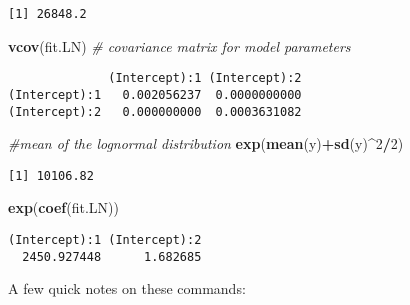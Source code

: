 \documentclass[]{book}
\newenvironment{Shaded}{\begin{snugshade}}{\end{snugshade}}
\newcommand{\KeywordTok}[1]{\textcolor[rgb]{0.13,0.29,0.53}{\textbf{#1}}}
\newcommand{\DecValTok}[1]{\textcolor[rgb]{0.00,0.00,0.81}{#1}}
\newcommand{\CommentTok}[1]{\textcolor[rgb]{0.56,0.35,0.01}{\textit{#1}}}
\newcommand{\OperatorTok}[1]{\textcolor[rgb]{0.81,0.36,0.00}{\textbf{#1}}}
\newcommand{\NormalTok}[1]{#1}
\theoremstyle{definition}
\theoremstyle{definition}
\theoremstyle{definition}
\theoremstyle{remark}
\begin{document}
\begin{verbatim}
[1] 26848.2
\end{verbatim}

\begin{Shaded}
\begin{Highlighting}[]
\KeywordTok{vcov}\NormalTok{(fit.LN)                 }\CommentTok{# covariance matrix for model parameters }
\end{Highlighting}
\end{Shaded}

\begin{verbatim}
              (Intercept):1 (Intercept):2
(Intercept):1   0.002056237  0.0000000000
(Intercept):2   0.000000000  0.0003631082
\end{verbatim}

\begin{Shaded}
\begin{Highlighting}[]
\CommentTok{#mean of the lognormal distribution}
\KeywordTok{exp}\NormalTok{(}\KeywordTok{mean}\NormalTok{(y)}\OperatorTok{+}\KeywordTok{sd}\NormalTok{(y)}\OperatorTok{^}\DecValTok{2}\OperatorTok{/}\DecValTok{2}\NormalTok{)}
\end{Highlighting}
\end{Shaded}

\begin{verbatim}
[1] 10106.82
\end{verbatim}

\begin{Shaded}
\begin{Highlighting}[]
\KeywordTok{exp}\NormalTok{(}\KeywordTok{coef}\NormalTok{(fit.LN))}
\end{Highlighting}
\end{Shaded}

\begin{verbatim}
(Intercept):1 (Intercept):2 
  2450.927448      1.682685 
\end{verbatim}

A few quick notes on these commands:
\end{document}
